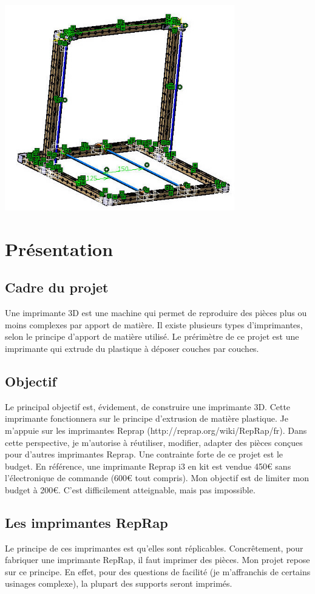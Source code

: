 \includegraphics[width=10cm]{frame.jpg}
\section{Présentation}
\subsection{Cadre du projet}
Une imprimante 3D est une machine qui permet de reproduire des pièces %
plus ou moins complexes par apport de matière. Il existe plusieurs types %
d'imprimantes, selon le principe d'apport de matière utilisé. Le prérimètre %
de ce projet est une imprimante qui extrude du plastique à déposer couches %
par couches.
%
\subsection{Objectif}
Le principal objectif est, évidement, de construire une imprimante 3D. Cette %
imprimante fonctionnera sur le principe d'extrusion de matière plastique. Je %
m'appuie sur les imprimantes Reprap (http://reprap.org/wiki/RepRap/fr). Dans %
cette perspective, je m'autorise à réutiliser, modifier, adapter des pièces %
conçues pour d'autres imprimantes Reprap.%
%
Une contrainte forte de ce projet est le budget. En référence, une imprimante %
Reprap i3 en kit est vendue 450\euro{} sans l'électronique de commande (600\euro{} tout %
compris). Mon objectif est de limiter mon budget à 200\euro{}. C'est difficilement %
atteignable, mais pas impossible.
%
\subsection{Les imprimantes RepRap}
Le principe de ces imprimantes est qu'elles sont réplicables. Concrêtement, %
pour fabriquer une imprimante RepRap, il faut imprimer des pièces. Mon projet %
repose sur ce principe. En effet, pour des questions de facilité (je m'affranchis %
de certains usinages complexe), la plupart des supports seront imprimés.